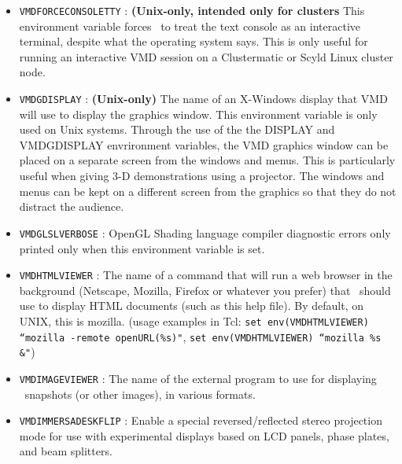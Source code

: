 \begin{itemize}
  \item {\tt VMDFORCECONSOLETTY} :
   {\bf (Unix-only, intended only for clusters}
   This environment variable forces \VMD\ to treat the text console
   as an interactive terminal, despite what the operating system says.
   This is only useful for running an interactive VMD session on a 
   Clustermatic or Scyld Linux cluster node. 

  \item {\tt VMDGDISPLAY} :
   {\bf (Unix-only)}
   The name of an X-Windows display that VMD will use to display
   the graphics window.  This environment variable is only used
   on Unix systems.  Through the use of the the DISPLAY and
   VMDGDISPLAY envrironment variables, the VMD graphics window can
   be placed on a separate screen from the windows and menus.  This is
   particularly useful when giving 3-D demonstrations using a projector.
   The windows and menus can be kept on a different screen from the graphics
   so that they do not distract the audience.

  \item {\tt VMDGLSLVERBOSE} :
   OpenGL Shading language compiler diagnostic errors only printed
   only when this environment variable is set.

  \item {\tt VMDHTMLVIEWER} :
   The name of a command that will run a web browser in the background 
   (Netscape, Mozilla, Firefox or whatever you prefer)
   that \VMD\ should use to display HTML documents (such as this help
   file). By default, on UNIX, this is mozilla. (usage examples in Tcl: 
   {\tt set env(VMDHTMLVIEWER) ``mozilla -remote openURL(\%s)"}, 
   {\tt set env(VMDHTMLVIEWER) ``mozilla \%s \&"})

  \item {\tt VMDIMAGEVIEWER} :
   The name of the external program to use for displaying \VMD\
   snapshots (or other images), in various formats.

  \item {\tt VMDIMMERSADESKFLIP} :
   Enable a special reversed/reflected stereo projection mode for 
   use with experimental displays based on LCD panels, phase plates, 
   and beam splitters.


\end{itemize}
